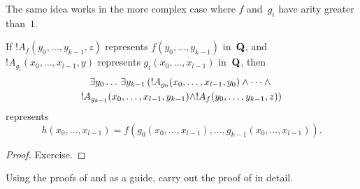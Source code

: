 \documentclass[../../../include/open-logic-section]{subfiles}
\begin{document}
The same idea works in the more complex case where $f$ and~$g_i$ have
arity greater than~$1$.

\begin{prop}
If $!A_f(y_0, \dots, y_{k-1}, z)$ represents $f(y_0, \dots, y_{k-1})$
in~$\mathbf{Q}$, and $!A_{g_i}(x_0, \dots, x_{l-1}, y)$ represents
$g_i(x_0, \dots, x_{l-1})$ in~$\mathbf{Q}$, then
\begin{multline*}
  \lexists[y_0\dots][\lexists[y_{k-1}][(!A_{g_0}(x_0,\dots,x_{l-1},y_0) \land
      \dots \land {}]]\\
  !A_{g_{k-1}}(x_0,\dots,x_{l-1},y_{k-1}) \land !A_f(y_0,\dots,y_{k-1},z))
\end{multline*}
represents
\[
h(x_0, \dots, x_{l-1}) = f(g_0(x_0, \dots, x_{l-1}), \dots, g_{k-1}(x_0,
\dots, x_{l-1})).
\]
\end{prop}

\begin{proof}
Exercise.
\end{proof}

\begin{prob}
Using the proofs of  and
 as a guide, carry out the proof of
 in detail.
\end{prob}
\end{document}
